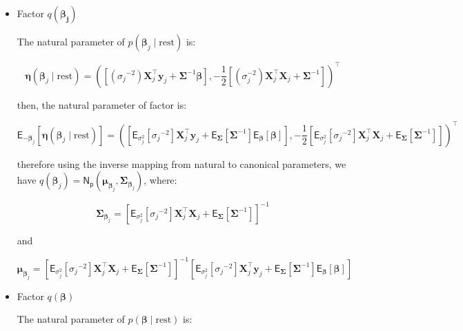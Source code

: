 \begin{appendix}
\begin{itemize}
\newpage

\item Factor $q(\bm{\beta_j})$

The natural parameter of $p(\bm{\beta}_j \mid \text{rest}) $ is:

\begin{equation}
\bm{\eta}(\bm{\beta}_j \mid \text{rest})=\left(\left[ ({\sigma_j}^{-2}) \bm{X}_{j}^\top \bm{y}_{j} + \bm{\Sigma}^{-1} \bm{\beta} \right],-\frac{1}{2}\left[ (\sigma_j^{-2}) \bm{X}_{j}^\top \bm{X}_{j}  + \bm{\Sigma}^{-1} \right]\right)^\top
\end{equation}

then, the natural parameter of factor is:

\begin{equation}
\mathsf{E}_{-\bm{\beta}_j}\left[\bm{\eta}(\bm{\beta}_j \mid \text{rest})\right]=\left(\left[\mathsf{E}_{\sigma^2_j}\left[{\sigma_j}^{-2}\right] \bm{X}_{j}^\top \bm{y}_{j} + \mathsf{E}_{\bm{\Sigma}}\left[\bm{\Sigma}^{-1}\right] \mathsf{E}_{\bm{\beta}}\left[\bm{\beta} \right] \right],-\frac{1}{2}\left[ \mathsf{E}_{\sigma^2_j}\left[{\sigma_j}^{-2}\right] \bm{X}_{j}^\top \bm{X}_{j}  + \mathsf{E}_{\bm{\Sigma}}\left[\bm{\Sigma}^{-1}\right]  \right]\right)^\top
\end{equation}

therefore using the inverse mapping from natural to canonical parameters, we have $q(\bm{\beta}_j)=\mathsf{N_p}(\bm{\mu}_{\bm{\beta}_j},\bm{\Sigma}_{\bm{\beta}_j})$, where:

\begin{equation}
\bm{\Sigma}_{\bm{\beta}_j} = \left[ \mathsf{E}_{\sigma^2_j}\left[{\sigma_j}^{-2}\right] \bm{X}_{j} ^\top\bm{X}_{j}  + \mathsf{E}_{\bm{\Sigma}}\left[\bm{\Sigma}^{-1}\right]  \right]^{-1}
\end{equation}

and

\begin{equation}
\bm{\mu}_{\bm{\beta}_j}= \left[ \mathsf{E}_{\sigma^2_j}\left[{\sigma_j}^{-2}\right] \bm{X}_{j}^\top \bm{X}_{j}  + \mathsf{E}_{\bm{\Sigma}}\left[\bm{\Sigma}^{-1}\right]  \right]^{-1}\left[\mathsf{E}_{\sigma^2_j}\left[{\sigma_j}^{-2}\right] \bm{X}_{j}^\top \bm{y}_{j} + \mathsf{E}_{\bm{\Sigma}}\left[\bm{\Sigma}^{-1}\right] \mathsf{E}_{\bm{\beta}}\left[\bm{\beta} \right] \right]
\end{equation}

\item Factor $q(\bm{\beta})$

The natural parameter of $p(\bm{\beta}\mid \text{rest}) $ is:


\end{itemize}
\end{appendix}
